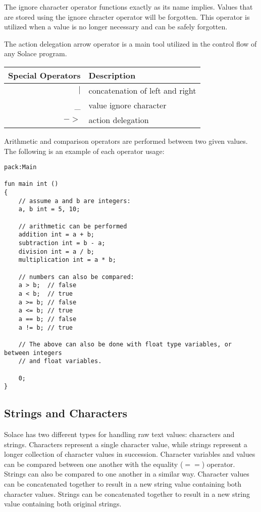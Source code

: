 \documentclass{article}
\begin{document}
The ignore character operator functions exactly as its name implies. Values that are stored
using the ignore chracter operator will be forgotten. This operator is utilized when a value
is no longer necessary and can be safely forgotten.

The action delegation arrow operator is a main tool utilized in the control flow of any
Solace program.

\begin{center}
\begin{tabular}{|r|l|}
	\hline
	Special Operators & Description \\
	\hline
	\hline
	$|$ & concatenation of left and right \\
	\_ & value ignore character \\
	$->$ & action delegation \\
	\hline
\end{tabular}
\end{center}

Arithmetic and comparison operators are performed between two given values. The following
is an example of each operator usage:

\begin{lstlisting}
pack:Main

fun main int ()
{
	// assume a and b are integers:
	a, b int = 5, 10;
	
	// arithmetic can be performed
	addition int = a + b;
	subtraction int = b - a;
	division int = a / b;
	multiplication int = a * b;
	
	// numbers can also be compared:
	a > b;  // false
	a < b;  // true
	a >= b; // false
	a <= b; // true
	a == b; // false
	a != b; // true
	
	// The above can also be done with float type variables, or between integers
	// and float variables.
	
	0;
}
\end{lstlisting}

\subsection{Strings and Characters}

Solace has two different types for handling raw text values: characters and strings. Characters
represent a single character value, while strings represent a longer collection of character
values in succession. Character variables and values can be compared between one another
with the equality ($==$) operator. Strings can also be compared to one another in a
similar way. Character values can be concatenated together to result in a new string value
containing both character values. Strings can be concatenated together to result in a new
string value containing both original strings.
\end{document}
